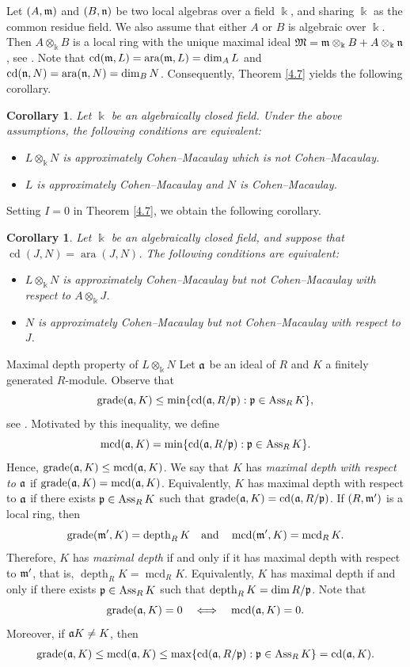 \documentclass[10pt,a4paper]{amsart}
\makeatletter
\numberwithin{equation}{theorem}
\newtheorem{corollary}[theorem]{Corollary}
\theoremstyle{definition}
\theoremstyle{fact}
\theoremstyle{conjecture}
\newcommand{\Ass}{\operatorname{Ass}}
\newcommand{\grade}{\operatorname{grade}}
\newcommand{\ara}{\operatorname{ara}}
\newcommand{\cd}{\operatorname{cd}}
\newcommand{\mcd}{\operatorname{mcd}}
\newcommand{\depth}{\operatorname{depth}}
\newcommand{\fm}{\frak{m}}
\newcommand{\fp}{\frak{p}}
\newcommand{\fa}{\frak{a}}
\newcommand{\fn}{\frak{n}}
\def\section{\@startsection{section}{1}%
\z@{.7\linespacing\@plus\linespacing}{.5\linespacing}%
{\normalfont\Large\bfseries\filcenter}}
\makeatother
\begin{document}
 Let $(A, \fm)$ and $(B, \fn)$ be two local algebras over a field $\Bbbk$, and sharing $\Bbbk$ as the common residue field.
 We also assume that either $A$ or $B$ is algebraic over $\Bbbk$. Then $A\otimes_\Bbbk B$ is a local ring
  with the unique maximal ideal $\mathfrak{M}= \fm \otimes_\Bbbk B + A \otimes_\Bbbk \fn$, see \cite{R4}.
  Note that $\cd(\fm, L)=\ara(\fm, L)=\dim_AL$ and $\cd(\fn, N)=\ara(\fn, N)=\dim_BN$.
    Consequently, Theorem \ref{4.7} yields the following corollary.
 \begin{corollary}
\label{4.8}
Let $\Bbbk$ be an algebraically closed field. Under the above assumptions, the following conditions are equivalent:
 \begin{itemize}
\item[{(a)}] $L\otimes_\Bbbk N$ is approximately Cohen--Macaulay which is not Cohen--Macaulay.
\item[{(b)}] $L$ is approximately Cohen--Macaulay and $N$ is Cohen--Macaulay.
 \end{itemize}
 \end{corollary}
Setting $I=0$ in Theorem \ref{4.7}, we obtain the following corollary.
\begin{corollary}
\label{4.9}
Let $\Bbbk$ be an algebraically closed field, and suppose that
$\cd(J,N)=\ara(J,N)$. The following conditions are equivalent:
\begin{itemize}
    \item[(a)] $L\otimes_\Bbbk N$ is approximately Cohen--Macaulay but not Cohen--Macaulay with respect to $A\otimes_\Bbbk J$.
    \item[(b)] $N$ is approximately Cohen--Macaulay but not Cohen--Macaulay with respect to $J$.
\end{itemize}
\end{corollary}


\section{Maximal depth property of $L\otimes_{\Bbbk} N$}
Let $\fa$ be an ideal of $R$ and $K$ a finitely generated $R$-module.
Observe that
\[
\grade(\fa, K)\leq \min\{\cd(\fa, R/\fp): \fp\in \Ass_RK\},
\]
see \cite[Proposition 2.2]{R6}. Motivated by this inequality, we define
\[
\mcd(\fa, K)=\min\{\cd(\fa, R/\fp): \fp\in \Ass_RK\}.
\]
Hence, $\grade(\fa, K)\leq \mcd(\fa, K)$.
We say that $K$ has \emph{maximal depth with respect to $\fa$} if $\grade(\fa, K)=\mcd(\fa, K)$.
Equivalently, $K$ has maximal depth with respect to $\fa$ if there exists
$\fp\in\Ass_RK$ such that $\grade(\fa, K)=\cd(\fa, R/\fp)$. If $(R,\fm')$ is a local ring, then
\[
\grade(\fm', K)=\depth_R K
\quad\text{and}\quad
\mcd(\fm', K)=\mcd_R K.
\]
Therefore, $K$ has \emph{maximal depth} if and only if it has maximal depth with respect to $\fm'$, that is,
$\depth_R K=\mcd_R K$.
Equivalently, $K$ has maximal depth if and only if there exists
$\fp\in\Ass_RK$ such that $\depth_R K=\dim R/\fp$. Note that
\[
\grade(\fa, K)=0
\quad\Longleftrightarrow\quad
\mcd(\fa, K)=0.
\]
Moreover, if $\fa K\neq K$, then
 \begin{eqnarray}	
\label{5.0.1}
\grade(\fa, K)\leq \mcd(\fa, K)\leq \max \{\cd(\fa, R/\fp): \fp\in \Ass_RK\}=\cd(\fa, K).
\end{eqnarray}
\end{document}
